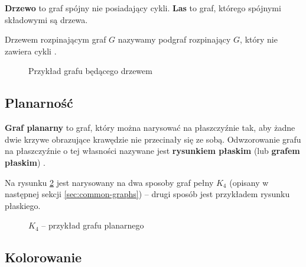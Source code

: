\textbf{Drzewo} to graf spójny nie posiadający cykli. \textbf{Las} to graf, którego spójnymi składowymi są drzewa.

Drzewem rozpinającym graf $G$ nazywamy podgraf rozpinający $G$, który nie zawiera cykli \cite[10]{wilson-beineke}. 

\begin{figure}[h]
\centering
{}
\caption{Przykład grafu będącego drzewem} \label{fig:tree-example}
\end{figure}


\subsection*{Planarność}

\textbf{Graf planarny} to graf, który można narysować na płaszczyźnie tak, aby żadne dwie krzywe obrazujące krawędzie nie przecinały się ze sobą. Odwzorowanie grafu na płaszczyźnie o tej własności nazywane jest \textbf{rysunkiem płaskim} (lub \textbf{grafem płaskim}) \cite[82]{wilson}. 

Na rysunku \ref{fig:planar-graph-example} jest narysowany na dwa sposoby graf pełny $K_4$ (opisany w następnej sekcji \ref{sec:common-graphs}) -- drugi sposób jest przykładem rysunku płaskiego. 

\begin{figure}[h]
\centering
{}
\caption{$K_4$ -- przykład grafu planarnego} \label{fig:planar-graph-example}
\end{figure}


\subsection*{Kolorowanie}

